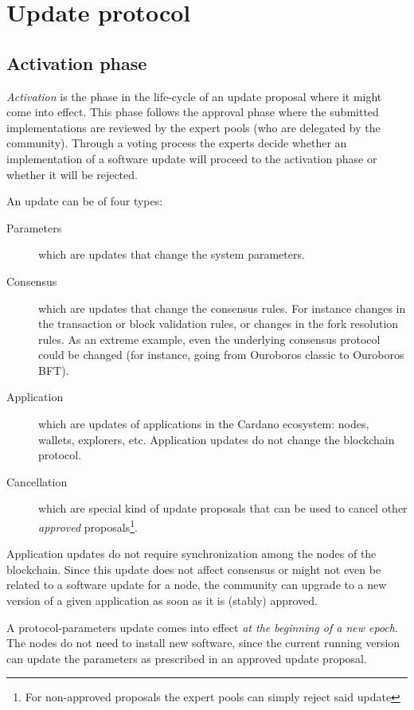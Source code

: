 \section{Update protocol}

\subsection{Activation phase}
\label{sec:activation-phase}

\emph{Activation} is the phase in the life-cycle of an update proposal where it
might come into effect.
%
This phase follows the approval phase where the submitted implementations are
reviewed by the expert pools (who are delegated by the community).
%
Through a voting process the experts decide whether an implementation of a
software update will proceed to the activation phase or whether it will be
rejected.

An update can be of four types:
\begin{description}
\item[Parameters] which are updates that change the system parameters.
\item[Consensus] which are updates that change the consensus rules. For instance
  changes in the transaction or block validation rules, or changes in the fork
  resolution rules. As an extreme example, even the underlying consensus
  protocol could be changed (for instance, going from Ouroboros classic to
  Ouroboros BFT).
\item[Application] which are updates of applications in the Cardano ecosystem:
  nodes, wallets, explorers, etc. Application updates do not change the
  blockchain protocol.
\item[Cancellation] which are special kind of update proposals that can be used
  to cancel other \emph{approved} proposals\footnote{For non-approved proposals
    the expert pools can simply reject said update}.
\end{description}

Application updates do not require synchronization among the nodes of the
blockchain. Since this update does not affect consensus or might not even be
related to a software update for a node, the community can upgrade to a new
version of a given application as soon as it is (stably) approved.

A protocol-parameters update comes into effect \emph{at the beginning of a new
  epoch}. The nodes do not need to install new software, since the current
running version can update the parameters as prescribed in an approved update
proposal.

